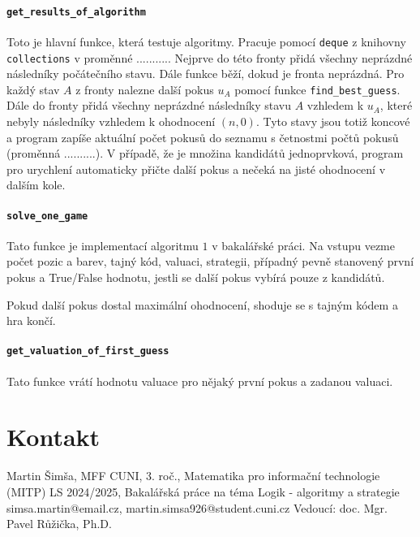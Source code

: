 \documentclass[12pt,a4paper]{article}
\begin{document}
\paragraph{\texttt{get\_results\_of\_algorithm}}
Toto je hlavní funkce, která testuje algoritmy. Pracuje pomocí \texttt{deque} z knihovny \texttt{collections} v proměnné ........... Nejprve do této fronty přidá všechny neprázdné následníky počátečního stavu. Dále funkce běží, dokud je fronta neprázdná. Pro každý stav $A$ z fronty nalezne další pokus $u_A$ pomocí funkce \texttt{find\_best\_guess}. Dále do fronty přidá všechny neprázdné následníky stavu $A$ vzhledem k $u_A$, které nebyly následníky vzhledem k ohodnocení $(n,0)$. Tyto stavy jsou totiž koncové a program zapíše aktuální počet pokusů do seznamu s četnostmi počtů pokusů (proměnná ..........). V případě, že je množina kandidátů jednoprvková, program pro urychlení automaticky přičte další pokus a nečeká na jisté ohodnocení v dalším kole.


\paragraph{\texttt{solve\_one\_game}}
Tato funkce je implementací algoritmu $1$ v bakalářské práci. Na vstupu vezme počet pozic a barev, tajný kód, valuaci, strategii, případný pevně stanovený první pokus a True/False hodnotu, jestli se další pokus vybírá pouze z kandidátů. 

Pokud další pokus dostal maximální ohodnocení, shoduje se s tajným kódem a hra končí. 


\paragraph{\texttt{get\_valuation\_of\_first\_guess}}
Tato funkce vrátí hodnotu valuace pro nějaký první pokus a zadanou valuaci. 


\section{Kontakt}
Martin Šimša, MFF CUNI, 3. roč., Matematika pro informační technologie (MITP)
LS 2024/2025, Bakalářská práce na téma Logik - algoritmy a strategie
simsa.martin@email.cz, martin.simsa926@student.cuni.cz
Vedoucí: doc. Mgr. Pavel Růžička, Ph.D.
\end{document}
